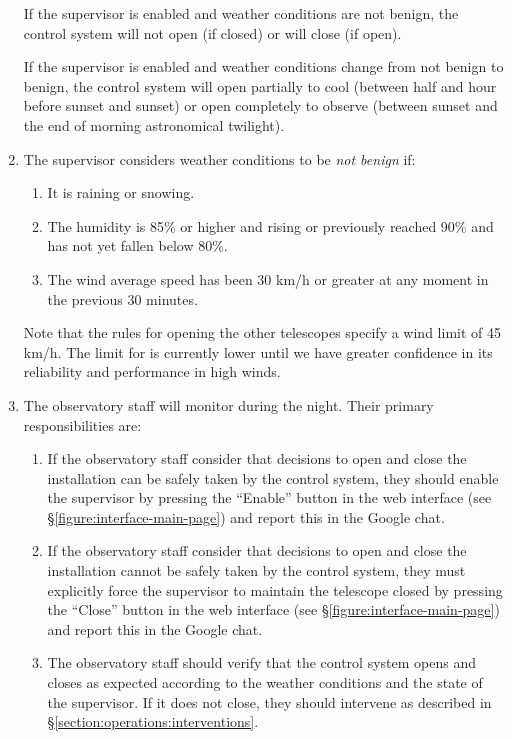 \begin{enumerate}
If the supervisor is enabled and weather conditions are not benign, the control system will not open (if closed) or will close (if open).

If the supervisor is enabled and weather conditions change from not benign to benign, the control system will open partially to cool (between half and hour before sunset and sunset) or open completely to observe (between sunset and the end of morning astronomical twilight).

\item
The supervisor considers weather conditions to be \emph{not benign} if:
\begin{enumerate}
\item It is raining or snowing.
\item The humidity is 85\% or higher and rising or previously reached 90\% and has not yet fallen below 80\%.
\item The wind average speed has been 30 km/h or greater at any moment in the previous 30 minutes.  
\end{enumerate}
Note that the rules for opening the other telescopes specify a wind limit of 45 km/h. The limit for {\projectname} is currently lower until we have greater confidence in its reliability and performance in high winds.

\item
The observatory staff will monitor {\projectname} during the night. Their primary responsibilities are:
\begin{enumerate}
\item If the observatory staff consider that decisions to open and close the installation can be safely taken by the control system, they should enable the supervisor by pressing the “Enable” button in the web interface (see \S\ref{figure:interface-main-page}) and report this in the Google chat.
\item If the observatory staff consider that decisions to open and close the installation cannot be safely taken by the control system, they must explicitly force the supervisor to maintain the telescope closed by pressing the “Close” button in the web interface (see \S\ref{figure:interface-main-page}) and report this in the Google chat. 
\item
The observatory staff should verify that the control system opens and closes as expected according to the weather conditions and the state of the supervisor. If it does not close, they should intervene as described in \S\ref{section:operations:interventions}.


\end{enumerate}
\end{enumerate}
